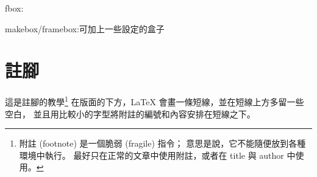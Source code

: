 fbox:

makebox/framebox:可加上一些設定的盒子



\newpage
\section{註腳}
這是註腳的教學\footnote{附註 (footnote) 是一個脆弱 (fragile) 指令； 意思是說，它不能隨便放到各種環境中執行。 最好只在正常的文章中使用附註，或者在 title 與 author 中使用。}
在版面的下方，LaTeX 會畫一條短線，並在短線上方多留一些空白， 並且用比較小的字型將附註的編號和內容安排在短線之下。
\newpage